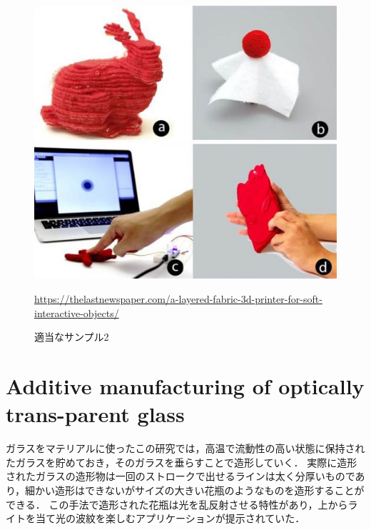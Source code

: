 \begin{figure}[H]
  \centering
  \includegraphics[width=10truecm]{./fig/ALayered.jpg}
  \caption{適当なサンプル2}
  \url{https://thelastnewspaper.com/a-layered-fabric-3d-printer-for-soft-interactive-objects/} %
  \label{fig:ferret}
\end{figure}



\section{ Additive manufacturing of optically trans-parent glass}
\label{sec:enum}
ガラスをマテリアルに使ったこの研究では，高温で流動性の高い状態に保持されたガラスを貯めておき，そのガラスを垂らすことで造形していく．
実際に造形されたガラスの造形物は一回のストロークで出せるラインは太く分厚いものであり，細かい造形はできないがサイズの大きい花瓶のようなものを造形することができる．
この手法で造形された花瓶は光を乱反射させる特性があり，上からライトを当て光の波紋を楽しむアプリケーションが提示されていた．


